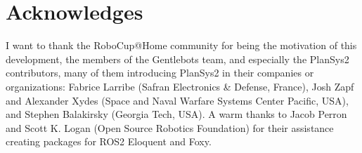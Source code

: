 \documentclass[letterpaper, 10 pt, conference]{IEEEtran}
\begin{document}
\section{Acknowledges}
I want to thank the RoboCup@Home community for being the motivation of this development, the members of the Gentlebots team, and especially the PlanSys2 contributors, many of them introducing PlanSys2 in their companies or organizations: Fabrice Larribe (Safran Electronics \& Defense, France), Josh Zapf and Alexander Xydes (Space and Naval Warfare Systems Center Pacific, USA), and Stephen Balakirsky (Georgia Tech, USA). A warm thanks to Jacob Perron and Scott K. Logan (Open Source Robotics Foundation) for their assistance creating packages for ROS2 Eloquent and Foxy.


  
  
\end{document}
